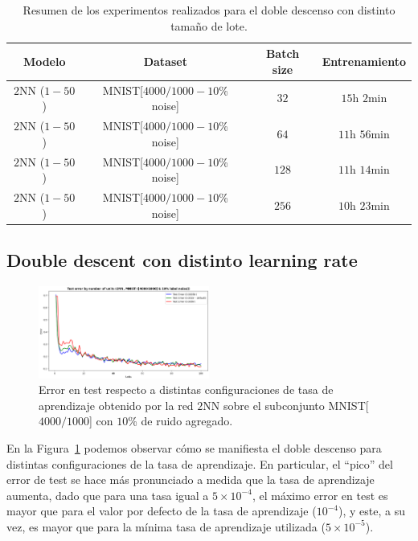 \begin{table}[h!]
    \centering
    \begin{tabular}{|c|c|c|c|}
    \hline
    \textbf{Modelo}       & \textbf{Dataset} & \textbf{Batch size} & \textbf{Entrenamiento} \\ 
    \hline
    $2$NN ($1-50$)     & MNIST[$4000/1000 - 10$\% noise]      & $32$      & $15$h $2$min         \\ 
    $2$NN ($1-50$)     & MNIST[$4000/1000 - 10$\% noise]      & $64$      & $11$h $56$min         \\ 
    $2$NN ($1-50$)     & MNIST[$4000/1000 - 10$\% noise]      & $128$      & $11$h $14$min         \\ 
    $2$NN ($1-50$)     & MNIST[$4000/1000 - 10$\% noise]      & $256$      & $10$h $23$min         \\
    \hline
    \end{tabular}
    \caption[Resumen de los experimentos realizados para el doble descenso con distinto tamaño de lote.]{Resumen de los experimentos realizados para el doble descenso con distinto tamaño de lote.}\label{tab:dddbatchsizes}
\end{table}

\subsection*{Double descent con distinto learning rate}

\begin{figure}[h!]
    \centering
    \includegraphics[width=0.5\textwidth]{img/experiments/learning_rates_ddd.png}
    \caption[Doble descenso para distintas tasas de aprendizaje.]{Error en test respecto a distintas configuraciones de tasa de aprendizaje obtenido por la red $2$NN sobre el subconjunto MNIST[$4000/1000$] con $10$\% de ruido agregado.}
    \label{fig:difflr}
\end{figure}

En la Figura~\ref{fig:difflr} podemos observar cómo se manifiesta el doble descenso para distintas configuraciones de la tasa de aprendizaje. En particular, el ``pico'' del error de test se hace más pronunciado a medida que la tasa de aprendizaje aumenta, dado que para una tasa igual a $5 \times 10^{-4}$, el máximo error en test es mayor que para el valor por defecto de la tasa de aprendizaje ($10^{-4}$), y este, a su vez, es mayor que para la mínima tasa de aprendizaje utilizada ($5 \times 10^{-5}$).\newline

